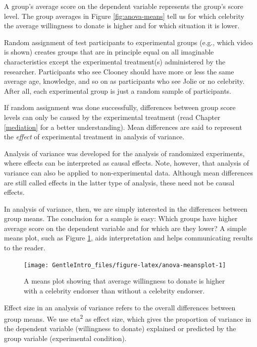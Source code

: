 \documentclass[a4paper]{book}
\theoremstyle{definition}
\theoremstyle{definition}
\theoremstyle{definition}
\theoremstyle{remark}
\begin{document}
A group's average score on the dependent variable represents the group's
score level. The group averages in Figure \ref{fig:anova-means} tell us
for which celebrity the average willingness to donate is higher and for
which situation it is lower.

Random assignment of test participants to experimental groups (e.g.,
which video is shown) creates groups that are in principle equal on all
imaginable characteristics except the experimental treatment(s)
administered by the researcher. Participants who see Clooney should have
more or less the same average age, knowledge, and so on as participants
who see Jolie or no celebrity. After all, each experimental group is
just a random sample of participants.

If random assignment was done successfully, differences between group
score levels can only be caused by the experimental treatment (read
Chapter \ref{mediation} for a better understanding). Mean differences
are said to represent the \emph{effect} of experimental treatment in
analysis of variance.

Analysis of variance was developed for the analysis of randomized
experiments, where effects can be interpreted as causal effects. Note,
however, that analysis of variance can also be applied to
non-experimental data. Although mean differences are still called
effects in the latter type of analysis, these need not be causal
effects.

In analysis of variance, then, we are simply interested in the
differences between group means. The conclusion for a sample is easy:
Which groups have higher average score on the dependent variable and for
which are they lower? A simple means plot, such as Figure
\ref{fig:anova-meansplot}, aids interpretation and helps communicating
results to the reader.

\begin{figure}[H]
\texttt{[image: GentleIntro\_files/figure-latex/anova-meansplot-1]} \caption{A means plot showing that average willingness to donate is higher with a celebrity endorser than without a celebrity endorser.}\label{fig:anova-meansplot}
\end{figure}

Effect size in an analysis of variance refers to the overall differences
between group means. We use eta\textsuperscript{2} as effect size, which
gives the proportion of variance in the dependent variable (willingness
to donate) explained or predicted by the group variable (experimental
condition).
\end{document}
